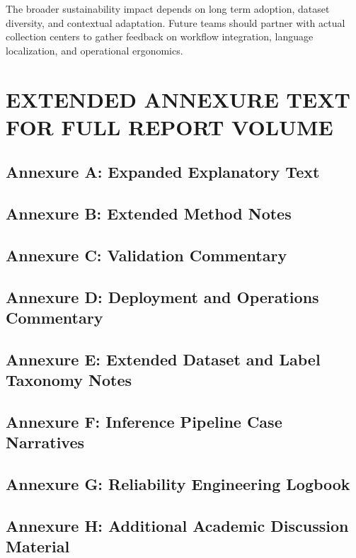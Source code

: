 \documentclass[12pt,a4paper]{report}
\begin{document}
The broader sustainability impact depends on long term adoption, dataset diversity, and contextual adaptation. Future teams should partner with actual collection centers to gather feedback on workflow integration, language localization, and operational ergonomics.

\chapter{EXTENDED ANNEXURE TEXT FOR FULL REPORT VOLUME}
\section{Annexure A: Expanded Explanatory Text}
\lipsum[1-25]

\section{Annexure B: Extended Method Notes}
\lipsum[26-45]

\section{Annexure C: Validation Commentary}
\lipsum[46-60]

\section{Annexure D: Deployment and Operations Commentary}
\lipsum[61-75]

\section{Annexure E: Extended Dataset and Label Taxonomy Notes}
\lipsum[76-90]

\section{Annexure F: Inference Pipeline Case Narratives}
\lipsum[91-105]

\section{Annexure G: Reliability Engineering Logbook}
\lipsum[106-120]

\section{Annexure H: Additional Academic Discussion Material}
\lipsum[121-135]
\end{document}
